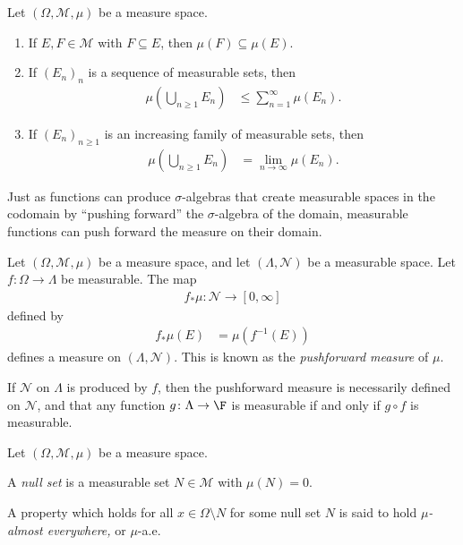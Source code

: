 \begin{lemma}
  Let $\left(\Omega,\mathcal{M},\mu\right)$ be a measure space.
  \begin{enumerate}[(1)]
    \item If $E,F\in \mathcal{M}$ with $F\subseteq E$, then $\mu\left(F\right) \subseteq \mu\left(E\right)$.
    \item If $\left(E_n\right)_{n}$ is a sequence of measurable sets, then
      \begin{align*}
        \mu\left(\bigcup_{n\geq 1}E_n\right) &\leq \sum_{n=1}^{\infty}\mu\left(E_n\right).
      \end{align*}
    \item If $\left(E_n\right)_{n\geq 1}$ is an increasing family of measurable sets, then
      \begin{align*}
        \mu\left(\bigcup_{n\geq 1}E_n\right) &= \lim_{n\rightarrow\infty}\mu\left(E_n\right).
      \end{align*}
  \end{enumerate}
\end{lemma}
Just as functions can produce $\sigma$-algebras that create measurable spaces in the codomain by ``pushing forward'' the $\sigma$-algebra of the domain, measurable functions can push forward the measure on their domain.
\begin{definition}
  Let $\left(\Omega,\mathcal{M},\mu\right)$ be a measure space, and let $\left(\Lambda,\mathcal{N}\right)$ be a measurable space. Let $f\colon \Omega\rightarrow \Lambda$ be measurable. The map
  \begin{align*}
    f_{\ast}\mu\colon \mathcal{N}\rightarrow [0,\infty]
  \end{align*}
  defined by
  \begin{align*}
    f_{\ast}\mu\left(E\right) &= \mu\left(f^{-1}\left(E\right)\right)
  \end{align*}
  defines a measure on $\left(\Lambda,\mathcal{N}\right)$. This is known as the \textit{pushforward measure} of $\mu$.\newline

  If $\mathcal{N}$ on $\Lambda$ is produced by $f$, then the pushforward measure is necessarily defined on $\mathcal{N}$, and that any function $g\colon \Lambda\rightarrow \F$ is measurable if and only if $g\circ f$ is measurable.
\end{definition}
\begin{definition}
  Let $\left(\Omega,\mathcal{M},\mu\right)$ be a measure space.\newline

  A \textit{null set} is a measurable set $N\in \mathcal{M}$ with $\mu\left(N\right) = 0$.\newline

  A property which holds for all $x\in \Omega\setminus N$ for some null set $N$ is said to hold \textit{$\mu$-almost everywhere,} or $\mu$-a.e.
\end{definition}
